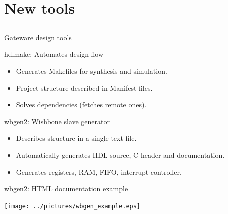 \documentclass[compress,red]{beamer}
\begin{document}
\section{New tools}

\subsection*{} %

\begin{frame}{Gateware design tools}

  \begin{block}{hdlmake: Automates design flow}
    \begin{itemize}
    \item Generates Makefiles for synthesis and simulation.
    \item Project structure described in Manifest files.
    \item Solves dependencies (fetches remote ones).
    \end{itemize}
  \end{block}

  \begin{block}{wbgen2: Wishbone slave generator}
    \begin{itemize}
    \item Describes structure in a single text file.
    \item Automatically generates HDL source, C header and documentation.
    \item Generates registers, RAM, FIFO, interrupt controller.
    \end{itemize}
  \end{block}


\end{frame}

\begin{frame}{wbgen2: HTML documentation example}

  \begin{center}
    \texttt{[image: ../pictures/wbgen\_example.eps]}
  \end{center}


\end{frame}
\end{document}
